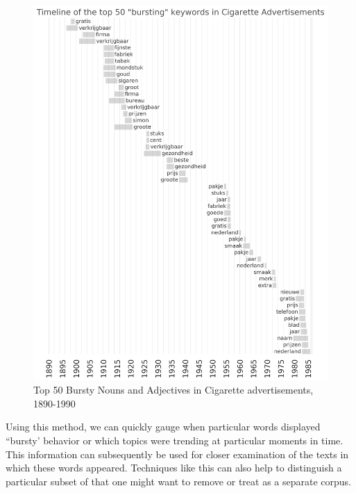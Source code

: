 \documentclass[USenglish]{article}
\begin{document}
\begin{figure}%
  \centering
  \includegraphics[width=.9\textwidth]{figures/bursts_top50}%
  \caption{Top 50 Bursty Nouns and Adjectives in Cigarette advertisements, 1890-1990}%
  \label{fig:burst_words}%
\end{figure}

Using this method, we can quickly gauge when particular words displayed ``bursty' behavior or which topics were trending at particular moments in time. This information can subsequently be used for closer examination of the texts in which these words appeared. Techniques like this can also help to distinguish a particular subset of that one might want to remove or treat as a separate corpus. 
\end{document}
